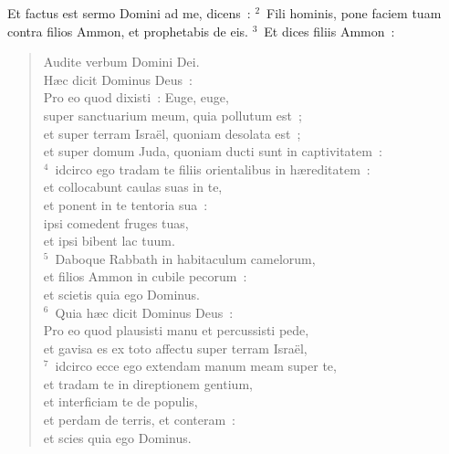 \lettrine[lines=10,image=true,loversize=0.05,lraise=-0.03]{E}{}t factus est sermo Domini ad me, dicens~:
${}^{2}$~Fili hominis, pone faciem tuam contra filios Ammon, et prophetabis de eis.
${}^{3}$~Et dices filiis Ammon~: \begin{flushleft}\begin{verse}Audite verbum Domini Dei.\\ H\ae c dicit Dominus Deus~:\\ Pro eo quod dixisti~: Euge, euge,\\ super sanctuarium meum, quia pollutum est~;\\ et super terram Isra\"el, quoniam desolata est~;\\ et super domum Juda, quoniam ducti sunt in captivitatem~:\\
${}^{4}$~idcirco ego tradam te filiis orientalibus in h\ae reditatem~:\\ et collocabunt caulas suas in te,\\ et ponent in te tentoria sua~:\\ ipsi comedent fruges tuas,\\ et ipsi bibent lac tuum.\\
${}^{5}$~Daboque Rabbath in habitaculum camelorum,\\ et filios Ammon in cubile pecorum~:\\ et scietis quia ego Dominus.\\
${}^{6}$~Quia h\ae c dicit Dominus Deus~:\\ Pro eo quod plausisti manu et percussisti pede,\\ et gavisa es ex toto affectu super terram Isra\"el,\\
${}^{7}$~idcirco ecce ego extendam manum meam super te,\\ et tradam te in direptionem gentium,\\ et interficiam te de populis,\\ et perdam de terris, et conteram~:\\ et scies quia ego Dominus.\end{verse}\end{flushleft}


